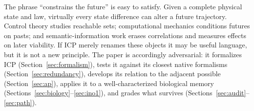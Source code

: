 The phrase ``constrains the future'' is easy to satisfy. Given a complete
physical state and law, virtually every state difference can alter a future
trajectory. Control theory studies reachable sets; computational mechanics
conditions futures on pasts; and semantic-information work erases correlations
and measures effects on later viability. If ICP merely renames these objects it
may be useful language, but it is not a new principle. The paper is
accordingly adversarial: it formalizes ICP (Section~\ref{sec:formalism}), tests
it against its closest native formalisms (Section~\ref{sec:redundancy}), develops
its relation to the adjacent possible (Section~\ref{sec:ap}),
applies it to a well-characterized biological memory
(Sections~\ref{sec:biology}--\ref{sec:ino1}), and grades what survives
(Sections~\ref{sec:audit}--\ref{sec:path}).
